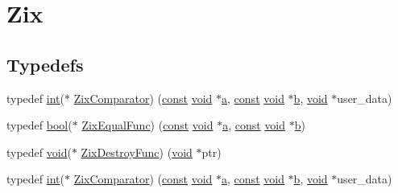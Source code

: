 \hypertarget{group__zix}{}\section{Zix}
\label{group__zix}
\subsection*{Typedefs}
\begin{DoxyCompactItemize}
\item 
typedef \hyperlink{xmltok_8h_a5a0d4a5641ce434f1d23533f2b2e6653}{int}($\ast$ \hyperlink{group__zix_gaa647997c2e16e85391dad2d77c02aff6}{Zix\+Comparator}) (\hyperlink{getopt1_8c_a2c212835823e3c54a8ab6d95c652660e}{const} \hyperlink{sound_8c_ae35f5844602719cf66324f4de2a658b3}{void} $\ast$\hyperlink{rfft2d_test_m_l_8m_a4124bc0a9335c27f086f24ba207a4912}{a}, \hyperlink{getopt1_8c_a2c212835823e3c54a8ab6d95c652660e}{const} \hyperlink{sound_8c_ae35f5844602719cf66324f4de2a658b3}{void} $\ast$\hyperlink{convtest_8m_a21ad0bd836b90d08f4cf640b4c298e7c}{b}, \hyperlink{sound_8c_ae35f5844602719cf66324f4de2a658b3}{void} $\ast$user\+\_\+data)
\item 
typedef \hyperlink{mac_2config_2i386_2lib-src_2libsoxr_2soxr-config_8h_abb452686968e48b67397da5f97445f5b}{bool}($\ast$ \hyperlink{group__zix_ga4cb30cbc7c5989a17b2b73ee23f63686}{Zix\+Equal\+Func}) (\hyperlink{getopt1_8c_a2c212835823e3c54a8ab6d95c652660e}{const} \hyperlink{sound_8c_ae35f5844602719cf66324f4de2a658b3}{void} $\ast$\hyperlink{rfft2d_test_m_l_8m_a4124bc0a9335c27f086f24ba207a4912}{a}, \hyperlink{getopt1_8c_a2c212835823e3c54a8ab6d95c652660e}{const} \hyperlink{sound_8c_ae35f5844602719cf66324f4de2a658b3}{void} $\ast$\hyperlink{convtest_8m_a21ad0bd836b90d08f4cf640b4c298e7c}{b})
\item 
typedef \hyperlink{sound_8c_ae35f5844602719cf66324f4de2a658b3}{void}($\ast$ \hyperlink{group__zix_ga116fe3bb614b937a4190ab5fe645cc87}{Zix\+Destroy\+Func}) (\hyperlink{sound_8c_ae35f5844602719cf66324f4de2a658b3}{void} $\ast$ptr)
\item 
typedef \hyperlink{xmltok_8h_a5a0d4a5641ce434f1d23533f2b2e6653}{int}($\ast$ \hyperlink{group__zix_gaa647997c2e16e85391dad2d77c02aff6}{Zix\+Comparator}) (\hyperlink{getopt1_8c_a2c212835823e3c54a8ab6d95c652660e}{const} \hyperlink{sound_8c_ae35f5844602719cf66324f4de2a658b3}{void} $\ast$\hyperlink{rfft2d_test_m_l_8m_a4124bc0a9335c27f086f24ba207a4912}{a}, \hyperlink{getopt1_8c_a2c212835823e3c54a8ab6d95c652660e}{const} \hyperlink{sound_8c_ae35f5844602719cf66324f4de2a658b3}{void} $\ast$\hyperlink{convtest_8m_a21ad0bd836b90d08f4cf640b4c298e7c}{b}, \hyperlink{sound_8c_ae35f5844602719cf66324f4de2a658b3}{void} $\ast$user\+\_\+data)

\end{DoxyCompactItemize}
